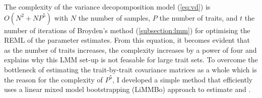 The complexity of the variance decopomposition model (\cref{eq:vd}) is \(O(N^2 + NP^5)\) with \(N\) the number of samples, \(P\) the number of traits, and \(t\) the number of iterations of Broyden's method (\cref{subsection:lmm}) for optimising the REML of the parameter estimates. From this equation, it becomes evident that as the number of traits increases, the complexity increases by a power of four and explains why this LMM set-up is not feasable for large trait sets. To overcome the bottleneck of estimating the trait-by-trait covariance matrices as a whole which is the reason for the complexity of \(P^5\), I developed a simple method that efficiently uses a linear mixed model bootstrapping (LiMMBo) approach to estimate  and .